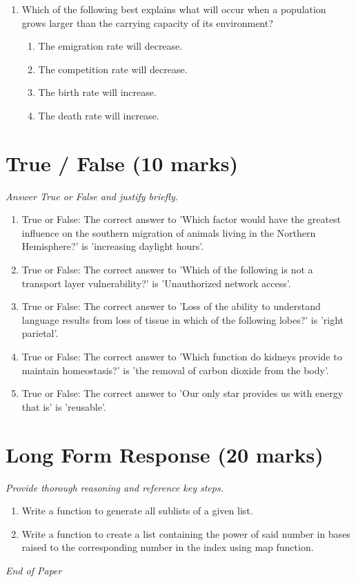 \documentclass[12pt]{article}
\begin{document}
\begin{enumerate}[label=\arabic*.]
\begin{enumerate}[label=(\alph*)]
\end{enumerate}
\item Which of the following best explains what will occur when a population grows larger than the carrying capacity of its environment?
\begin{enumerate}[label=(\alph*)]
    \item The emigration rate will decrease.
    \item The competition rate will decrease.
    \item The birth rate will increase.
    \item The death rate will increase.
\end{enumerate}
\end{enumerate}

\section*{True / False (10 marks)}
\textit{Answer True or False and justify briefly.}
\begin{enumerate}[label=\arabic*.]
\item True or False: The correct answer to 'Which factor would have the greatest influence on the southern migration of animals living in the Northern Hemisphere?' is 'increasing daylight hours'.
\item True or False: The correct answer to 'Which of the following is not a transport layer vulnerability?' is 'Unauthorized network access'.
\item True or False: The correct answer to 'Loss of the ability to understand language results from loss of tissue in which of the following lobes?' is 'right parietal'.
\item True or False: The correct answer to 'Which function do kidneys provide to maintain homeostasis?' is 'the removal of carbon dioxide from the body'.
\item True or False: The correct answer to 'Our only star provides us with energy that is' is 'reusable'.
\end{enumerate}

\section*{Long Form Response (20 marks)}
\textit{Provide thorough reasoning and reference key steps.}
\begin{enumerate}[label=\arabic*.]
\item Write a function to generate all sublists of a given list.
\item Write a function to create a list containing the power of said number in bases raised to
the corresponding number in the index using map function.
\end{enumerate}

\vfill
\noindent\textit{End of Paper}
\end{document}
